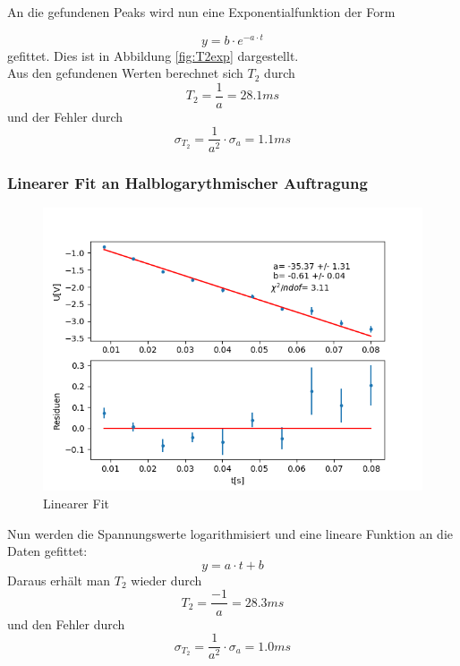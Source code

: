 \documentclass[12pt,a4paper]{article}
\begin{document}
An die gefundenen Peaks wird nun eine Exponentialfunktion der Form

\begin{equation}
y = b \cdot e^{-a\cdot t}
\end{equation}
gefittet. Dies ist in Abbildung \ref{fig:T2exp} dargestellt.\\
Aus den gefundenen Werten berechnet sich $T_2$ durch 
\begin{equation*}
T_2 = \dfrac{1}{a} = 28.1ms
\end{equation*}
und der Fehler durch
\begin{equation*}
\sigma_{T_2} = \dfrac{1}{a^2} \cdot \sigma_a = 1.1ms
\end{equation*}

\subsubsection{Linearer Fit an Halblogarythmischer Auftragung}

\begin{figure}
\centering
\includegraphics[scale=0.9]{Bilder/T2lin.png}
\caption{Linearer Fit}
\label{fig:T2lin}
\end{figure}

Nun werden die Spannungswerte logarithmisiert und eine lineare Funktion an die Daten gefittet:
\begin{equation}
y = a \cdot t + b
\end{equation}
Daraus erhält man $T_2$ wieder durch 
\begin{equation*}
T_2 = \dfrac{-1}{a} = 28.3ms
\end{equation*}
und den Fehler durch
\begin{equation*}
\sigma_{T_2} = \dfrac{1}{a^2} \cdot \sigma_a = 1.0ms
\end{equation*}
\end{document}
